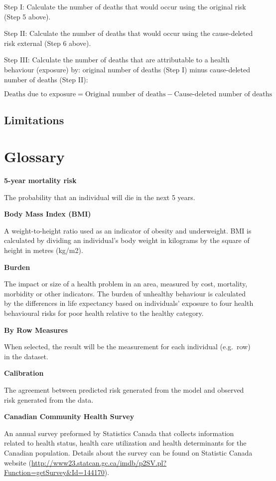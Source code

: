 \documentclass[]{book}
\begin{document}
Step I: Calculate the number of deaths that would occur using the
original risk (Step 5 above).

Step II: Calculate the number of deaths that would occur using the
cause-deleted risk external (Step 6 above).

Step III: Calculate the number of deaths that are attributable to a
health behaviour (exposure) by: original number of deaths (Step I) minus
cause-deleted number of deaths (Step II):

\[\text{Deaths due to exposure} = \text{Original number of deaths} - \text{Cause-deleted number of deaths}\]

\section{Limitations}\label{limitations}

\chapter{Glossary}\label{glossary}

\textbf{5-year mortality risk}

The probability that an individual will die in the next 5 years.

\textbf{Body Mass Index (BMI)}

A weight-to-height ratio used as an indicator of obesity and
underweight. BMI is calculated by dividing an individual's body weight
in kilograms by the square of height in metres (kg/m2).

\textbf{Burden}

The impact or size of a health problem in an area, measured by cost,
mortality, morbidity or other indicators. The burden of unhealthy
behaviour is calculated by the differences in life expectancy based on
individuals' exposure to four health behavioural risks for poor health
relative to the healthy category.

\textbf{By Row Measures}

When selected, the result will be the measurement for
each individual (e.g.~row) in the dataset.

\textbf{Calibration}

The agreement between predicted risk generated from the model and
observed risk generated from the data.

\textbf{Canadian Community Health Survey}

An annual survey preformed by Statistics Canada that collects
information related to health status, health care utilization and health
determinants for the Canadian population. Details about the survey can
be found on Statistic Canada website
(\url{http://www23.statcan.gc.ca/imdb/p2SV.pl?Function=getSurvey\&Id=144170}).
\end{document}
